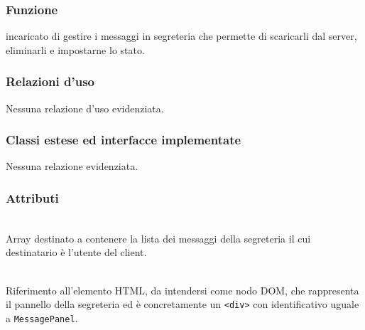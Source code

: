 
\subsubsection*{Funzione}
 incaricato di gestire i messaggi in segreteria che permette di scaricarli dal server, eliminarli e impostarne lo stato.

\subsubsection*{Relazioni d'uso}
Nessuna relazione d'uso evidenziata.

\subsubsection*{Classi estese ed interfacce implementate}
Nessuna relazione evidenziata.

\subsubsection*{Attributi}
\begin{description}
 \item{}\\
 Array destinato a contenere la lista dei messaggi della segreteria il cui destinatario è l'utente del client.

 \item{}\\
  Riferimento all'elemento HTML, da intendersi come nodo DOM, che rappresenta il pannello della segreteria ed è concretamente un \verb'<div>' con identificativo uguale a \verb'MessagePanel'.
\end{description}


